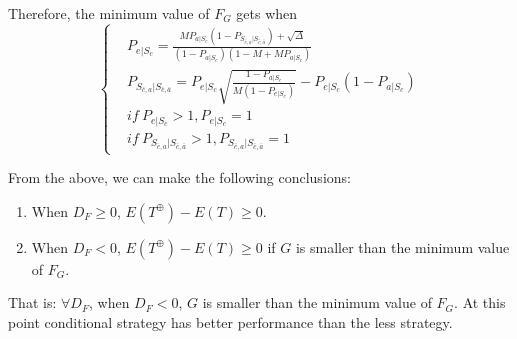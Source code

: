 Therefore, the minimum value of $F_G$ gets when
\begin{equation}
\left\{
\begin{split}
&P_{e|S_{c}} = \frac{MP_{a|S_{c}}(1-P_{S_{\bar{c}, a}|S_{\bar{c},\bar{a}}})+\sqrt{\Delta}}{(1-P_{a|S_{c}})(1-M+MP_{a|S_{c}})} \\
&P_{S_{\bar{c}, a}|S_{\bar{c},\bar{a}}} = P_{e|S_{c}}\sqrt{\frac{1-P_{a|S_{c}}}{M(1-P_{e|S_{c}})}}-P_{e|S_{c}}(1-P_{a|S_{c}}) \\
& if\  P_{e|S_{c}} >1, P_{e|S_{c}} = 1 \\
& if\  P_{S_{\bar{c}, a}|S_{\bar{c},\bar{a}}} >1, P_{S_{\bar{c}, a}|S_{\bar{c},\bar{a}}} = 1
\end{split}
\right.
\end{equation}

From the above, we can make the following conclusions:
\begin{enumerate}
  \item
  When $D_F \geq 0$, $E(T^{\oplus}) - E(T) \geq 0$.
  \item
  When $D_F < 0$, $E(T^{\oplus}) - E(T) \geq 0$ if $G$ is smaller than the minimum value of $F_G$.
\end{enumerate}

That is:
$\forall D_F$, when  $D_F < 0$, $G$ is smaller than the minimum value of $F_G$.
At this point conditional {\vwarm} strategy has better performance than the less {\vwarm} strategy.




